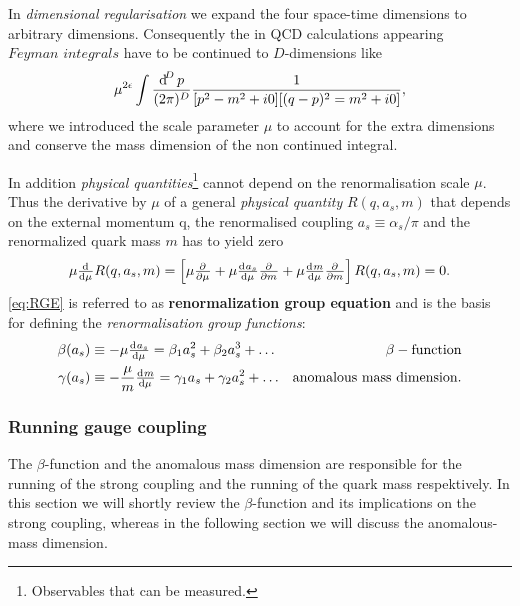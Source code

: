 \documentclass[../../index.tex]{subfiles}
\begin{document}
In \textit{dimensional regularisation} we expand the four space-time dimensions
to arbitrary dimensions. Consequently the in QCD calculations appearing
$\textit{Feyman integrals}$ have to be continued to $D$-dimensions like
\begin{equation}
  \label{eq:dimRegFeynmanIntegral}
  \mu^{2\epsilon} \int \frac{\dif^D p}{(2\pi)^D}\frac{1}{[p^2-m^2+i0][(q-p)^2=m^2+i0]},
\end{equation}
where we introduced the scale parameter $\mu$ to account for the extra
dimensions and conserve the mass dimension of the non continued integral.

In addition \textit{physical quantities}\footnote{Observables that can be
  measured.} cannot depend on the renormalisation scale $\mu$. Thus the
derivative by $\mu$ of a general \textit{physical quantity} $R(q, a_s, m)$ that
depends on the external momentum q, the renormalised coupling
$a_s\equiv\alpha_s/\pi$ and the renormalized quark mass $m$ has to yield zero
\begin{equation}
  \label{eq:RGE}
  \mu \od{}{\mu}R(q, a_s, m) = \left[ \mu \pd{}{\mu} + \mu \od{a_s}{\mu} \pd{}{m} + \mu \od{m}{\mu} \pd{}{m} \right] R(q, a_s, m) = 0.
\end{equation}
\cref{eq:RGE} is referred to as \textbf{renormalization group equation} and is
the basis for defining the \textit{renormalisation group functions}:
\begin{align}
  \beta(a_s) &\equiv -\mu \od{a_s}{\mu} = \beta_1 a_s^2 + \beta_2 a_s^3 + \dots & \beta-\text{function}
                                                                                  \label{eq:betaFunction} \\
  \gamma(a_s) &\equiv - \frac{\mu}{m} \od{m}{\mu} = \gamma_1 a_s + \gamma_2 a_s^2 + \dots & \text{anomalous mass dimension}.
                                                                                            \label{eq:anomalousMassDimension}
\end{align}

\subsubsection{Running gauge coupling}
The $\beta$-function and the anomalous mass dimension are responsible for the
running of the strong coupling and the running of the quark mass respektively.
In this section we will shortly review the $\beta$-function and its implications
on the strong coupling, whereas in the following section we will discuss the
anomalous-mass dimension.
\end{document}
